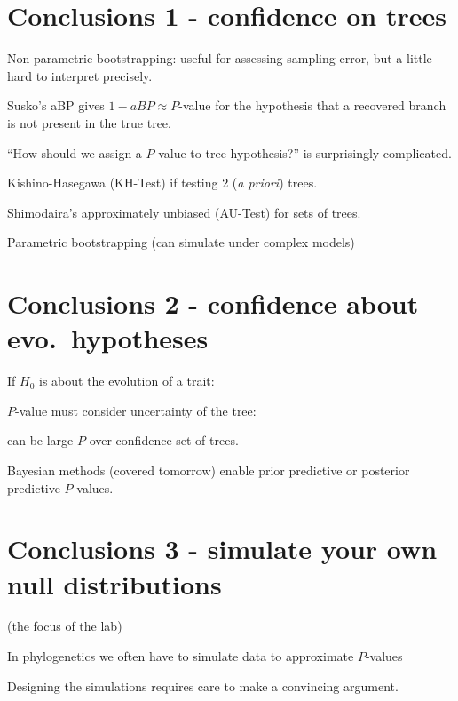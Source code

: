 \myNewSlide
\section*{Conclusions 1 - confidence on trees}\large
\large
\begin{compactenum}
    \item Non-parametric bootstrapping: useful for assessing sampling error, but a little hard to interpret  precisely.
    \begin{compactitem}
        \item Susko's  aBP gives $1 - aBP\approx P$-value for the hypothesis that a recovered branch is not present in the true tree. 
    \end{compactitem}
    \item ``How should we assign a $P$-value to tree hypothesis?'' is surprisingly complicated.
    \begin{compactitem}
        \item Kishino-Hasegawa (KH-Test) if testing 2 ({\em a priori}) trees.
        \item Shimodaira's approximately unbiased (AU-Test) for sets of trees.
        \item Parametric bootstrapping (can simulate under complex models)
    \end{compactitem}
\end{compactenum}

\myNewSlide
\section*{Conclusions 2 - confidence about evo.~hypotheses}
If $H_0$ is about the evolution of a trait:
\begin{compactenum}
    \item $P$-value must consider uncertainty of the tree:
    \begin{compactitem}
        \item can be large $P$ over confidence set of trees.
        \item Bayesian methods (covered tomorrow) enable prior predictive or posterior predictive $P$-values.
    \end{compactitem}
\end{compactenum}

\myNewSlide
\section*{Conclusions 3 - simulate your own null distributions}
(the focus of the lab)
\begin{compactenum}
    \item In phylogenetics we often have to simulate data to approximate $P$-values 
    \item Designing the simulations requires care to make a convincing argument.
\end{compactenum}
